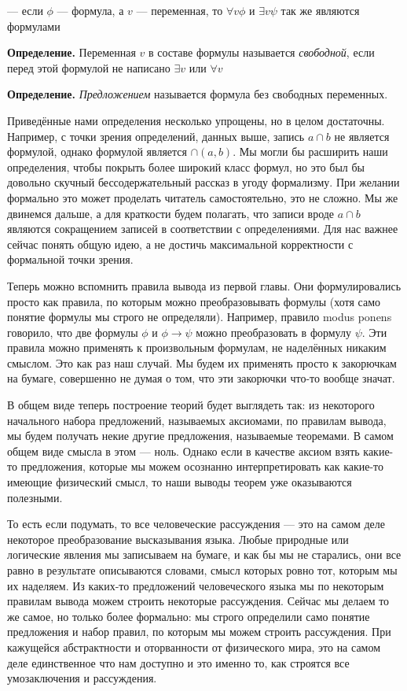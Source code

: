 — если $\phi$ — формула, а $v$ — переменная, то $\forall v \phi$ и $\exists v \psi$ так же являются формулами

{\bfseries Определение.} Переменная $v$ в составе формулы называется {\slshape свободной}, если перед этой формулой не написано $\exists v$ или $\forall v$

{\bfseries Определение.} {\slshape Предложением} называется формула без свободных переменных.

Приведённые нами определения несколько упрощены, но в целом достаточны. Например, с точки зрения определений, данных выше, запись $a\cap b$ не является формулой, однако формулой является $\cap(a, b)$. Мы могли бы расширить наши определения, чтобы покрыть более широкий класс формул, но это был бы довольно скучный бессодержательный рассказ в угоду формализму. При желании формально это может проделать читатель самостоятельно, это не сложно. Мы же двинемся дальше, а для краткости будем полагать, что записи вроде $a\cap b$ являются сокращением записей в соответствии с определениями. Для нас важнее сейчас понять общую идею, а не достичь максимальной корректности с формальной точки зрения.

Теперь можно вспомнить правила вывода из первой главы. Они формулировались просто как правила, по которым можно преобразовывать формулы (хотя само понятие формулы мы строго не определяли). Например, правило modus ponens говорило, что две формулы $\phi$ и $\phi\rightarrow\psi$ можно преобразовать в формулу $\psi$. Эти правила можно применять к произвольным формулам, не наделённых никаким смыслом. Это как раз наш случай. Мы будем их применять просто к закорючкам на бумаге, совершенно не думая о том, что эти закорючки что-то вообще значат.

В общем виде теперь построение теорий будет выглядеть так: из некоторого начального набора предложений, называемых аксиомами, по правилам вывода, мы будем получать некие другие предложения, называемые теоремами. В самом общем виде смысла в этом — ноль. Однако если в качестве аксиом взять какие-то предложения, которые мы можем осознанно интерпретировать как какие-то имеющие физический смысл, то наши выводы теорем уже оказываются полезными.

То есть если подумать, то все человеческие рассуждения — это на самом деле некоторое преобразование высказывания языка. Любые природные или логические явления мы записываем на бумаге, и как бы мы не старались, они все равно в результате описываются словами, смысл которых ровно тот, которым мы их наделяем. Из каких-то предложений человеческого языка мы по некоторым правилам вывода можем строить некоторые рассуждения. Сейчас мы делаем то же самое, но только более формально: мы строго определили само понятие предложения и набор правил, по которым мы можем строить рассуждения. При кажущейся абстрактности и оторванности от физического мира, это на самом деле единственное что нам доступно и это именно то, как строятся все умозаключения и рассуждения.

